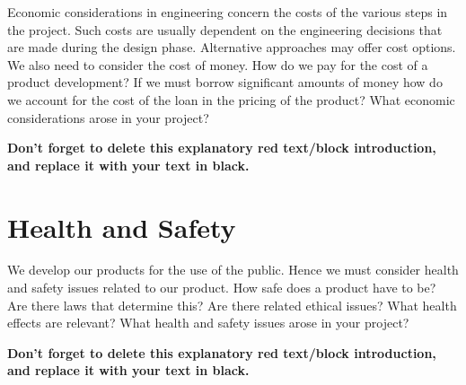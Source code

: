 \begin{tcolorbox}[      %
    boxrule=0pt,        %
    colback=white,      %
    coltext=red         %
]                       %
    Economic considerations in engineering concern the costs of the various steps in the project. Such costs are usually dependent on the engineering decisions that are made during the design phase. Alternative approaches may offer cost options. We also need to consider the cost of money. How do we pay for the cost of a product development? If we must borrow significant amounts of money how do we account for the cost of the loan in the pricing of the product? What economic considerations arose in your project?
    
    \vspace{15pt}       %
    \begin{center}      %
    \textbf{Don't forget to delete this explanatory red text/block introduction, and replace it with your text in black.}
    \end{center}        %
\end{tcolorbox}         %

\section{Health and Safety} %

\begin{tcolorbox}[      %
    boxrule=0pt,        %
    colback=white,      %
    coltext=red         %
]                       %
    We develop our products for the use of the public. Hence we must consider health and safety issues related to our product. How safe does a product have to be? Are there laws that determine this? Are there related ethical issues? What health effects are relevant? What health and safety issues arose in your project?
    
    \vspace{15pt}       %
    \begin{center}      %
    \textbf{Don't forget to delete this explanatory red text/block introduction, and replace it with your text in black.}
    \end{center}        %
\end{tcolorbox}         %

